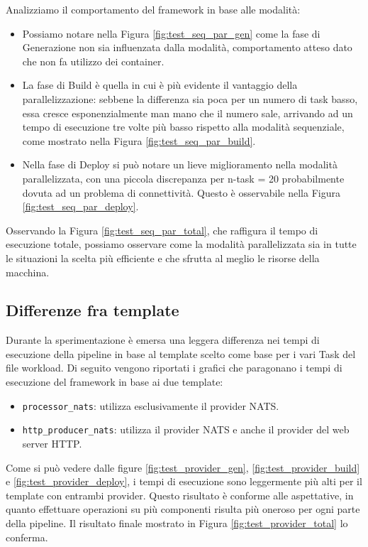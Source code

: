 Analizziamo il comportamento del framework in base alle modalità:
\begin{itemize}
    \item Possiamo notare nella Figura \ref{fig:test_seq_par_gen} come la fase di Generazione non sia influenzata dalla modalità, comportamento atteso dato che non fa utilizzo dei container.
    \item La fase di Build è quella in cui è più evidente il vantaggio della parallelizzazione: sebbene la differenza sia poca per un numero di task basso, essa cresce esponenzialmente man mano che il numero sale, arrivando ad un tempo di esecuzione tre volte più basso rispetto alla modalità sequenziale, come mostrato nella Figura \ref{fig:test_seq_par_build}.
    \item Nella fase di Deploy si può notare un lieve miglioramento nella modalità parallelizzata, con una piccola discrepanza per n-task = 20 probabilmente dovuta ad un problema di connettività. Questo è osservabile nella Figura \ref{fig:test_seq_par_deploy}.
\end{itemize}

Osservando la Figura \ref{fig:test_seq_par_total}, che raffigura il tempo di esecuzione totale, possiamo osservare come la modalità parallelizzata sia in tutte le situazioni la scelta più efficiente e che sfrutta al meglio le risorse della macchina.

\subsection{Differenze fra template}

Durante la sperimentazione è emersa una leggera differenza nei tempi di esecuzione della pipeline in base al template scelto come base per i vari Task del file workload. Di seguito vengono riportati i grafici che paragonano i tempi di esecuzione del framework in base ai due template:
\begin{itemize}
    \item \texttt{processor\_nats}: utilizza esclusivamente il provider NATS.
    \item \texttt{http\_producer\_nats}: utilizza il provider NATS e anche il provider del web server HTTP.
\end{itemize}
Come si può vedere dalle figure \ref{fig:test_provider_gen}, \ref{fig:test_provider_build} e \ref{fig:test_provider_deploy}, i tempi di esecuzione sono leggermente più alti per il template con entrambi provider. Questo risultato è conforme alle aspettative, in quanto effettuare operazioni su più componenti risulta più oneroso per ogni parte della pipeline. Il risultato finale mostrato in Figura \ref{fig:test_provider_total} lo conferma.

